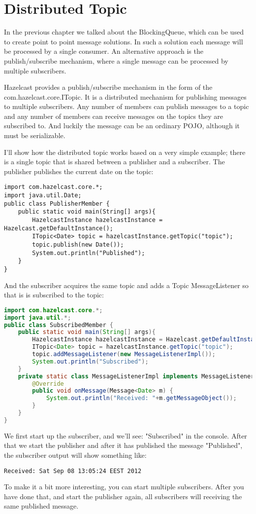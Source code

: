 \chapter{Distributed Topic}
In the previous chapter we talked about the BlockingQueue, which can be used to create point to point message solutions. In such a solution each message will be processed by a single consumer. An alternative approach is the publish/subscribe mechanism, where a single message can be processed by multiple subscribers.

Hazelcast provides a publish/subscribe mechanism in the form of the com.hazelcast.core.ITopic. It is a distributed mechanism for publishing messages to multiple subscribers. Any number of members can publish messages to a topic and any number of members can receive messages on the topics they are subscribed to. And luckily the message can be an ordinary POJO, although it must be serializable. 

I'll show how the distributed topic works based on a very simple example; there is a single topic that is shared between a publisher and a subscriber. The publisher publishes the current date on the topic:
\begin{verbatim}
import com.hazelcast.core.*;
import java.util.Date;
public class PublisherMember {
    public static void main(String[] args){
        HazelcastInstance hazelcastInstance = Hazelcast.getDefaultInstance();
        ITopic<Date> topic = hazelcastInstance.getTopic("topic");
        topic.publish(new Date());
        System.out.println("Published");
    }
}
\end{verbatim}
And the subscriber acquires the same topic and adds a Topic MessageListener so that is is subscribed to the topic:
\begin{lstlisting}[language=java]
import com.hazelcast.core.*;
import java.util.*;
public class SubscribedMember {
    public static void main(String[] args){
        HazelcastInstance hazelcastInstance = Hazelcast.getDefaultInstance();
        ITopic<Date> topic = hazelcastInstance.getTopic("topic");
        topic.addMessageListener(new MessageListenerImpl());
        System.out.println("Subscribed");
    }
    private static class MessageListenerImpl implements MessageListener<Date> {
        @Override
        public void onMessage(Message<Date> m) {
            System.out.println("Received: "+m.getMessageObject());
        }
    }
}
\end{lstlisting}
We first start up the subscriber, and we'll see: "Subscribed" in the console. After that we start the publisher and after it has published the message "Published", the subscriber output will show something like:
\begin{verbatim}
Received: Sat Sep 08 13:05:24 EEST 2012
\end{verbatim}
To make it a bit more interesting, you can start multiple subscribers. After you have done that, and start the publisher again, all subscribers will receiving the same published message.

